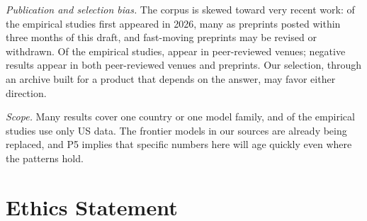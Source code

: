 \documentclass[11pt]{article}
\begin{document}
\emph{Publication and selection bias.} The corpus is skewed toward very recent work: \cEmpYearTwentySix{} of the \cEmp{} empirical studies first appeared in 2026, many as preprints posted within three months of this draft, and fast-moving preprints may be revised or withdrawn. Of the \cEmp{} empirical studies, \cEmpPeer{} appear in peer-reviewed venues; negative results appear in both peer-reviewed venues and preprints. Our selection, through an archive built for a product that depends on the answer, may favor either direction.

\emph{Scope.} Many results cover one country or one model family, and \cEmpUS{} of the \cEmp{} empirical studies use only US data. The frontier models in our sources are already being replaced, and P5 implies that specific numbers here will age quickly even where the patterns hold.

\section{Ethics Statement}
\label{sec:ethics}
\end{document}
